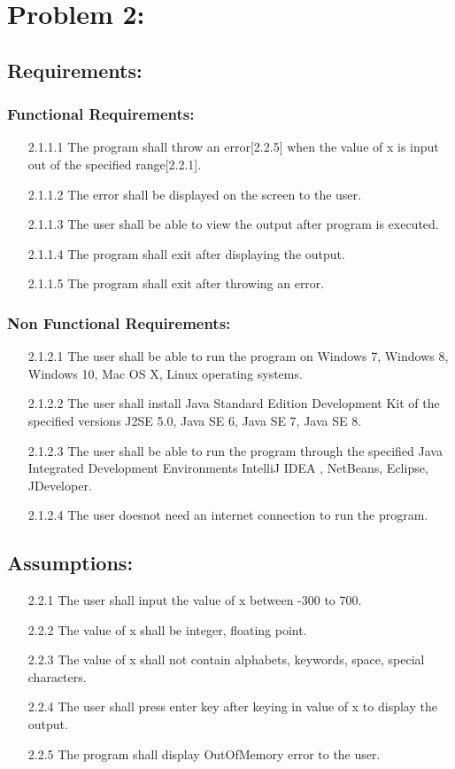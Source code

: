 \documentclass{article}
\begin{document}
\section{Problem 2:}
\subsection{Requirements:}
\subsubsection{Functional Requirements:}
\begin{itemize}
\item [2.1.1.1]The program shall throw an error[2.2.5] when the value of x is input out of the specified range[2.2.1].
\item [2.1.1.2]The error shall be displayed on the screen to the user.
\item [2.1.1.3]The user shall be able to view the output after program is executed.
\item [2.1.1.4]The program shall exit after displaying the output.
\item [2.1.1.5]The program shall exit after throwing an error.
\end{itemize}
\subsubsection{Non Functional Requirements:}
\begin{itemize}
\item [2.1.2.1]The user shall be able to run the program on Windows 7, Windows 8, Windows 10, Mac OS X, Linux operating systems.
\item [2.1.2.2]The user shall install Java Standard Edition Development Kit of the specified versions J2SE 5.0, Java SE 6, Java SE 7, Java SE 8.
\item [2.1.2.3]The user shall be able to run the program through the specified Java Integrated Development Environments IntelliJ IDEA , NetBeans, Eclipse, JDeveloper.
\item [2.1.2.4]The user doesnot need an internet connection to run the program.
\end{itemize}

\subsection{Assumptions:}
\begin{itemize}
\item [2.2.1]The user shall input the value of x between -300 to 700.
\item [2.2.2]The value of x shall be integer, floating point.
\item [2.2.3]The value of x shall not contain alphabets, keywords, space, special characters.
\item [2.2.4]The user shall press enter key after keying in value of x to display the output.
\item [2.2.5]The program shall display OutOfMemory error to the user.
\end{itemize}
\end{document}
